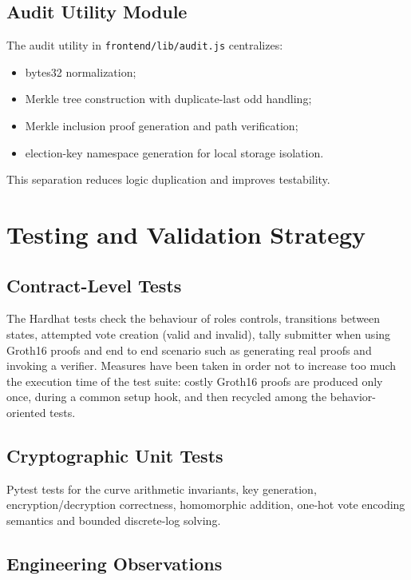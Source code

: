 \subsection{Audit Utility Module}

The audit utility in \texttt{frontend/lib/audit.js} centralizes:
\begin{itemize}
    \item bytes32 normalization;
    \item Merkle tree construction with duplicate-last odd handling;
    \item Merkle inclusion proof generation and path verification;
    \item election-key namespace generation for local storage isolation.
\end{itemize}

This separation reduces logic duplication and improves testability.

\section{Testing and Validation Strategy}

\subsection{Contract-Level Tests}

The Hardhat tests check the behaviour of roles controls, transitions between states, attempted vote creation (valid and invalid), tally submitter when using Groth16 proofs and end to end scenario such as generating real proofs and invoking a verifier. Measures have been taken in order not to increase too much the execution time of the test suite: costly Groth16 proofs are produced only once, during a common setup hook, and then recycled among the behavior-oriented tests.

\subsection{Cryptographic Unit Tests}

Pytest tests for the curve arithmetic invariants, key generation, encryption/decryption correctness, homomorphic addition, one-hot vote encoding semantics and bounded discrete-log solving.

\subsection{Engineering Observations}

